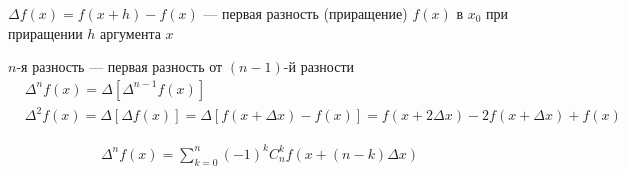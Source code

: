 \documentclass{article}
\begin{document}


$\Delta f(x) = f(x+h) - f(x)$  --- первая разность (приращение) $f(x)$ в $x_0$ при приращении $h$ аргумента $x$


$n$-я разность --- первая разность от $(n-1)$-й разности
\begin{align*}
	 & \Delta^{n}f(x)=\Delta[\Delta^{n-1}f(x)]                                                          \\
	 & \Delta^{2}f(x)=\Delta[\Delta f(x)]=\Delta[f(x+\Delta x)-f(x)]=f(x+2\Delta x)-2f(x+\Delta x)+f(x)
\end{align*}

\theorem
\begin{align*}
	\Delta^{n}f(x)=\sum_{k=0}^{n}(-1)^{k}C_{n}^{k}f(x+(n-k)\Delta x)
\end{align*}

\proof
\end{document}
